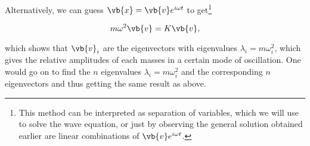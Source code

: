 \documentclass[a4paper,12pt]{report}
\begin{document}
Alternatively, we can guess \(\vb{x} = \vb{v} e^{i \omega t} \) to get\footnote{This method can be interpreted as separation of variables, which we will use to solve the wave equation, or just by observing the general solution obtained earlier are linear combinations of \(\vb{v} e^{i \omega t} \).} 

\begin{equation}
	m \omega ^2 \vb{v} = K \vb{v} ,
\end{equation}

which shows that \(\vb{v} _{i} \) are the eigenvectors with eigenvalues \(\lambda _{i} =  m \omega _{i}^2\), which gives the relative amplitudes of each masses in a certain mode of oscillation. One would go on to find the \(n\) eigenvalues \(\lambda _{i} = m \omega _{i}^2  \) and the corresponding \(n\) eigenvectors and thus getting the same result as above.
\end{document}
